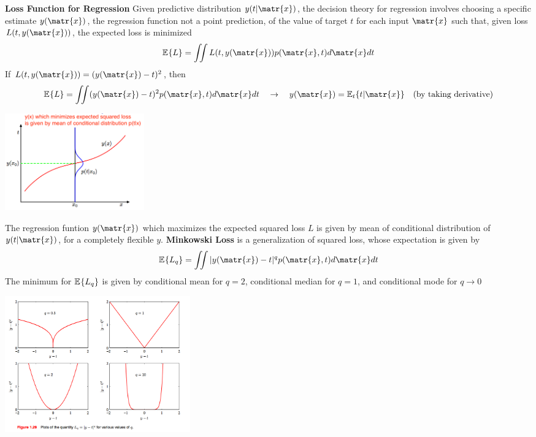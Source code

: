 \documentclass[11pt]{article}
\begin{document}
\begin{defn*}
    \textbf{Loss Function for Regression} Given predictive distribution $y(t|\matr{x})$, the decision theory for regression involves choosing a specific estimate $y(\matr{x})$, the regression function not a point prediction, of the value of target $t$ for each input $\matr{x}$ such that, given loss $L(t,y(\matr{x}))$, the expected loss is minimized
    \[
        \E{L} = \iint L(t,y(\matr{x})) p(\matr{x}, t) d\matr{x} dt
    \]
    If $L(t,y(\matr{x})) = (y(\matr{x}) - t)^2$, then 
    \[
        \E{L} = \iint (y(\matr{x}) - t)^2 p(\matr{x}, t) d\matr{x} dt
        \quad \rightarrow \quad 
        y(\matr{x}) = \E[t]{t|\matr{x}} \quad \text{(by taking derivative)}
    \]
    \begin{center}
        \includegraphics[width=6cm]{regression_func_for_squared_loss.jpg}
    \end{center}
    The regression funtion $y(\matr{x})$ which maximizes the expected squared loss $L$ is given by mean of conditional distribution of $y(t|\matr{x})$, for a completely flexible $y$. \textbf{Minkowski Loss} is a generalization of squared loss, whose expectation is given by 
    \[
        \E{L_q} = \iint |y(\matr{x}) - t|^q p(\matr{x}, t) d\matr{x} dt
    \]
    The minimum for $\mathbb{E}_{}\{L_q\}$ is given by conditional mean for $q=2$, conditional median for $q=1$, and conditional mode for $q\to 0$
    \begin{center}
        \includegraphics[width=8cm]{minkowski.jpg}
    \end{center}
\end{defn*}
\end{document}

